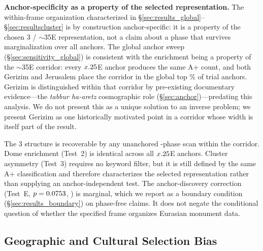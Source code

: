 \textbf{Anchor-specificity as a property of the selected representation.}
The within-frame organization characterized in
\S\ref{sec:results_global}--\S\ref{sec:resultscluster} is by
construction anchor-specific: it is a property of the chosen
3\textdegree{} / $\sim$35\textdegree{}E representation, not a claim
about a phase that survives marginalization over all anchors. The global anchor sweep
(\S\ref{sec:sensitivity_global}) is consistent with the enrichment
being a property of the $\sim$35\textdegree{}E corridor: every
$x.25$\textdegree{}E anchor produces the same A+ count, and
both Gerizim and Jerusalem place the corridor in the global top
\anchorSweepTopPct\% of \anchorSweepNanchors{} trial anchors. Gerizim
is distinguished within that corridor by pre-existing documentary
evidence---the \textit{tabbur ha-aretz} cosmographic role
(\S\ref{sec:anchor})---predating this analysis. We do not present
this as a unique solution to an inverse problem; we present Gerizim
as one historically motivated point in a corridor whose width is
itself part of the result.

The 3\textdegree{} structure is recoverable by any unanchored
\NharmonicsCoarse-phase scan within the corridor. Dome enrichment
(Test~2) is identical across all \NharmonicsCoarse{}
$x.25$\textdegree{}E anchors. Cluster asymmetry (Test~3)
requires no keyword filter, but it is still defined by the same
A+ classification and therefore characterizes the selected
representation rather than supplying an anchor-independent test. The
anchor-discovery correction (Test~E,
$p = 0.0753$, \anchorMaxPermPSig{}) is marginal, which we
report as a boundary condition (\S\ref{sec:results_boundary}) on
phase-free claims. It does not negate the conditional question of
whether the specified frame organizes Eurasian monument data.

\subsection{Geographic and Cultural Selection Bias}
\label{sec:limitations_geo}

